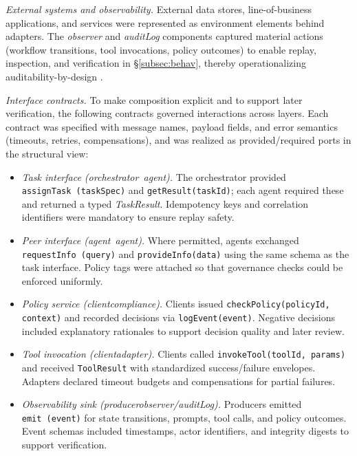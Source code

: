 \emph{External systems and observability.} External data stores, line-of-business applications, and services were represented as environment elements behind adapters. The \emph{observer} and \emph{auditLog} components captured material actions (workflow transitions, tool invocations, policy outcomes) to enable replay, inspection, and verification in §\ref{subsec:behav}, thereby operationalizing auditability-by-design \parencite{IEEEStandard1990}.

\emph{Interface contracts.} To make composition explicit and to support later verification, the following contracts governed interactions across layers. Each contract was specified with message names, payload fields, and error semantics (timeouts, retries, compensations), and was realized as provided/required ports in the structural view:
\begin{itemize}
  \item \emph{Task interface (orchestrator\textendash~agent).} The orchestrator provided \texttt{assignTask\ (taskSpec)} and \texttt{getResult(taskId)}; each agent required these and returned a typed \emph{TaskResult}. Idempotency keys and correlation identifiers were mandatory to ensure replay safety.
  \item \emph{Peer interface (agent\textendash~agent).} Where permitted, agents exchanged \texttt{requestInfo\ (query)} and \texttt{provideInfo(data)} using the same schema as the task interface. Policy tags were attached so that governance checks could be enforced uniformly.
  \item \emph{Policy service (client\textendash compliance).} Clients issued \texttt{checkPolicy(policyId, context)} and recorded decisions via \texttt{logEvent(event)}. Negative decisions included explanatory rationales to support decision quality and later review.
  \item \emph{Tool invocation (client\textendash adapter).} Clients called \texttt{invokeTool(toolId, params)} and received \texttt{ToolResult} with standardized success/failure envelopes. Adapters declared timeout budgets and compensations for partial failures.
  \item \emph{Observability sink (producer\textendash observer/auditLog).} Producers emitted \texttt{emit\ (event)} for state transitions, prompts, tool calls, and policy outcomes. Event schemas included timestamps, actor identifiers, and integrity digests to support verification.
\end{itemize}

